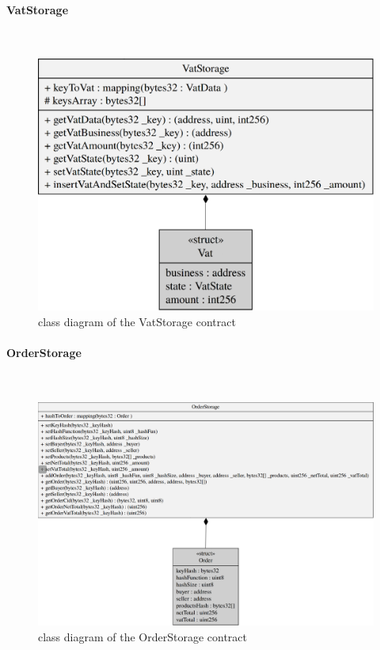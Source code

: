 \paragraph{VatStorage}\mbox{}\\
\begin{figure}[H]
	\centering
	\includegraphics[scale=0.30]{res/images/solidity/vatstorage.png}
	\caption{class diagram of the VatStorage contract}
\end{figure}
\pagebreak
\paragraph{OrderStorage}\mbox{}\\
\begin{figure}[H]
	\centering
	\includegraphics[scale=0.35]{res/images/solidity/orderstorage.png}
	\caption{class diagram of the OrderStorage contract}
\end{figure}

